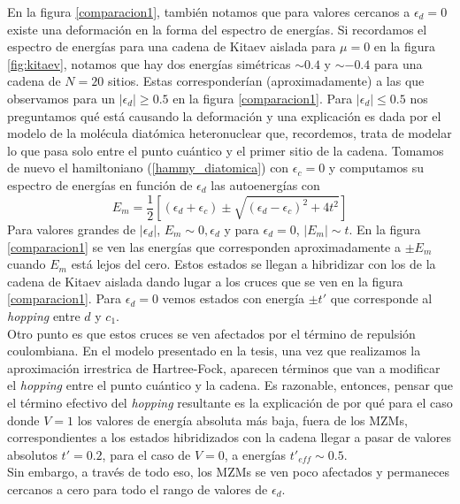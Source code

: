 En la figura \ref{comparacion1}, tambi\'{e}n notamos que para valores cercanos a $\epsilon_d=0$ existe una deformaci\'{o}n en la forma del espectro de energ\'{i}as. Si recordamos el espectro de energ\'{i}as para una cadena de Kitaev aislada para $\mu=0$ en la figura \ref{fig:kitaev}, notamos que hay dos energ\'{i}as sim\'{e}tricas $\sim 0.4$ y $\sim -0.4$ para una cadena de $N=20$ sitios. Estas corresponder\'{i}an (aproximadamente) a las que observamos para un $|\epsilon_d|\geq 0.5$ en la figura \ref{comparacion1}. Para $|\epsilon_d|\leq 0.5$ nos preguntamos qu\'{e} est\'{a} causando la deformaci\'{o}n y una explicaci\'{o}n es dada por el modelo de la mol\'{e}cula diat\'{o}mica heteronuclear que, recordemos, trata de modelar lo que pasa solo entre el punto cu\'{a}ntico y el primer sitio de la cadena. Tomamos de nuevo el hamiltoniano (\ref{hammy_diatomica}) con $\epsilon_c=0$ y computamos su espectro de energ\'{i}as en funci\'{o}n de $\epsilon_d$ las autoenerg\'{i}as con
\begin{equation}
    E_m=\frac{1}{2}[(\epsilon_d+\epsilon_c)\pm \sqrt{(\epsilon_d-\epsilon_c)^2+4t^2}]
\end{equation}
Para valores grandes de $|\epsilon_d|$, $E_m\sim 0, \epsilon_d$ y para $\epsilon_d=0$, $|E_m|\sim t$. En la figura \ref{comparacion1} se ven las energ\'{i}as que corresponden aproximadamente a $\pm E_m$ cuando $E_m$ est\'{a} lejos del cero. Estos estados se llegan a hibridizar con los de la cadena de Kitaev aislada dando lugar a los cruces que se ven en la figura \ref{comparacion1}. Para $\epsilon_d=0$ vemos estados con energ\'{i}a $\pm t'$ que corresponde al \emph{hopping} entre $d$ y $c_1$.\\
Otro punto es que estos cruces se ven afectados por el t\'{e}rmino de repulsi\'{o}n coulombiana. En el modelo presentado en la tesis, una vez que realizamos la aproximaci\'{o}n irrestrica de Hartree-Fock, aparecen t\'{e}rminos que van a modificar el \emph{hopping} entre el punto cu\'{a}ntico y la cadena. Es razonable, entonces, pensar que el t\'{e}rmino efectivo del \emph{hopping} resultante es la explicaci\'{o}n de por qu\'{e} para el caso donde $V=1$ los valores de energ\'{i}a absoluta m\'{a}s baja, fuera de los MZMs, correspondientes a los estados hibridizados con la cadena llegar a pasar de valores absolutos $t'=0.2$, para el caso de $V=0$, a energ\'{i}as $t'_{eff}\sim 0.5$.\\
Sin embargo, a trav\'{e}s de todo eso, los MZMs se ven poco afectados y permaneces cercanos a cero para todo el rango de valores de $\epsilon_d$.
%
